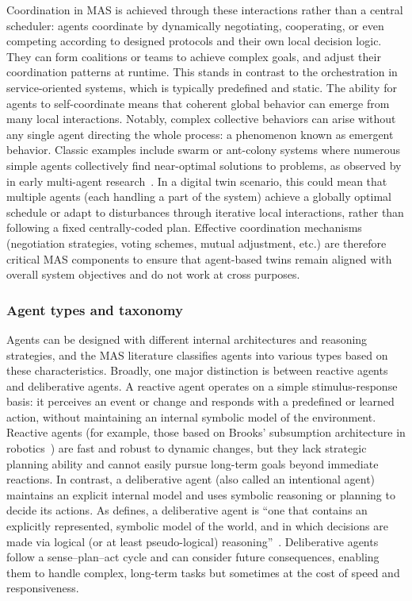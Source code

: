 Coordination in MAS is achieved through these interactions rather than a central scheduler: agents coordinate by dynamically negotiating, cooperating, or even competing according to designed protocols and their own local decision logic. They can form coalitions or teams to achieve complex goals, and adjust their coordination patterns at runtime. This stands in contrast to the orchestration in service-oriented systems, which is typically predefined and static. The ability for agents to self-coordinate means that coherent global behavior can emerge from many local interactions. Notably, complex collective behaviors can arise without any single agent directing the whole process: a phenomenon known as emergent behavior. Classic examples include swarm or ant-colony systems where numerous simple agents collectively find near-optimal solutions to problems, as observed by \citeauthor{nwana1996software} in early multi-agent research~\cite{nwana1996software}. In a digital twin scenario, this could mean that multiple agents (each handling a part of the system) achieve a globally optimal schedule or adapt to disturbances through iterative local interactions, rather than following a fixed centrally-coded plan. Effective coordination mechanisms (negotiation strategies, voting schemes, mutual adjustment, etc.) are therefore critical MAS components to ensure that agent-based twins remain aligned with overall system objectives and do not work at cross purposes.

\subsubsection{Agent types and taxonomy}
Agents can be designed with different internal architectures and reasoning strategies, and the MAS literature classifies agents into various types based on these characteristics. Broadly, one major distinction is between reactive agents and deliberative agents. A reactive agent operates on a simple stimulus-response basis: it perceives an event or change and responds with a predefined or learned action, without maintaining an internal symbolic model of the environment. Reactive agents (for example, those based on Brooks’ subsumption architecture in robotics~\cite{Brooks1986Subsumption}) are fast and robust to dynamic changes, but they lack strategic planning ability and cannot easily pursue long-term goals beyond immediate reactions. In contrast, a deliberative agent (also called an intentional agent) maintains an explicit internal model and uses symbolic reasoning or planning to decide its actions. As \citeauthor{Wooldridge1995IntelligentAgents} defines, a deliberative agent is “one that contains an explicitly represented, symbolic model of the world, and in which decisions are made via logical (or at least pseudo-logical) reasoning”~\cite{Wooldridge1995IntelligentAgents}. Deliberative agents follow a sense–plan–act cycle and can consider future consequences, enabling them to handle complex, long-term tasks but sometimes at the cost of speed and responsiveness.

